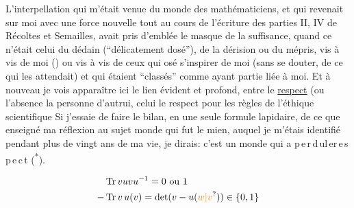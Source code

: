 L'interpellation qui m'était venue du monde des mathématiciens, et qui revenait sur moi avec une force nouvelle tout au cours de l'écriture des parties II, IV de Récoltes et Semailles,  avait pris d'emblée le masque de la suffisance, quand ce n'était celui du dédain (``délicatement dosé''), de la dérision ou du mépris,  vis à vis de moi () ou   vis à vis de ceux qui  osé s'inspirer de moi\deleted{\unsure{,}} (sans se douter,  de ce qui les attendait) et qui étaient ``classés'' comme ayant partie liée à moi. Et à nouveau je vois apparaître ici le lien évident et profond, entre le \uline{respect} (ou l'absence  la personne d'autrui,  celui   le respect pour les règles  de l'éthique scientifique  Si j'essaie de faire le bilan, en une  seule formule lapidaire, de ce que  enseigné ma réflexion au sujet   monde qui fut le mien, auquel je m'étais identifié pendant plus de vingt ans de ma vie, je dirais: c'est un monde qui a \mbox{p\,e\,r\,d\,u\quad l\,e\quad r\,e\,s\,p\,e\,c\,t} (\textsuperscript{*}).

\[
\begin{aligned}
&\operatorname{Tr}vuvu^{-1}=0\text{ ou }1\\
-&\operatorname{Tr}v\,u(v)=\det(v-u(\unsure{w|v}))\in\{0,1\}
\end{aligned}
\]

